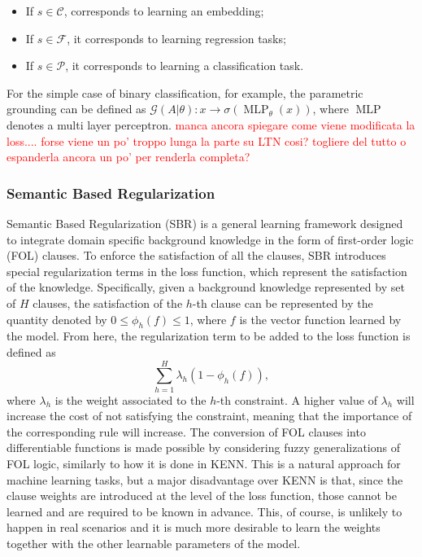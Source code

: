  \begin{itemize}
 	\item If $s \in \mathcal{C}$, corresponds to learning an embedding;
 	\item If $s \in \mathcal{F}$, it corresponds to learning regression tasks;
 	\item If $s \in \mathcal{P}$, it corresponds to learning a classification task.
 \end{itemize}

For the simple case of binary classification, for example, the parametric grounding can be defined as $\mathcal{G}(A|\theta):x \rightarrow \sigma(\operatorname{MLP}_{\theta}(x))$, where $\operatorname{MLP}$ denotes a multi layer perceptron.
\textcolor{red}{manca ancora spiegare come viene modificata la loss.... forse viene un po' troppo lunga la parte su LTN cosi? togliere del tutto o espanderla ancora un po' per renderla completa?}
 
 \subsubsection{Semantic Based Regularization}
 Semantic Based Regularization (SBR) is a general learning framework designed to integrate domain specific background knowledge in the form of first-order logic (FOL) clauses. To enforce the satisfaction of all the clauses, SBR introduces special regularization terms in the loss function, which represent the satisfaction of the knowledge. Specifically, given a background knowledge represented by set of $H$ clauses, the satisfaction of the $h$-th clause can be represented by the quantity denoted by $0 \leq \phi_h(f) \leq 1$, where $f$ is the vector function learned by the model. From here, the regularization term to be added to the loss function is defined as
 $$ \sum_{h=1}^H \lambda_h(1 - \phi_h(f)), $$
 where $\lambda_h$ is the weight associated to the $h$-th constraint. A higher value of $\lambda_h$ will increase the cost of not satisfying the constraint, meaning that the importance of the corresponding rule will increase. The conversion of FOL clauses into differentiable functions is made possible by considering fuzzy generalizations of FOL logic, similarly to how it is done in KENN. This is a natural approach for machine learning tasks, but a major disadvantage over KENN is that, since the clause weights are introduced at the level of the loss function, those cannot be learned and are required to be known in advance. This, of course, is unlikely to happen in real scenarios and it is much more desirable to learn the weights together with the other learnable parameters of the model.
 
